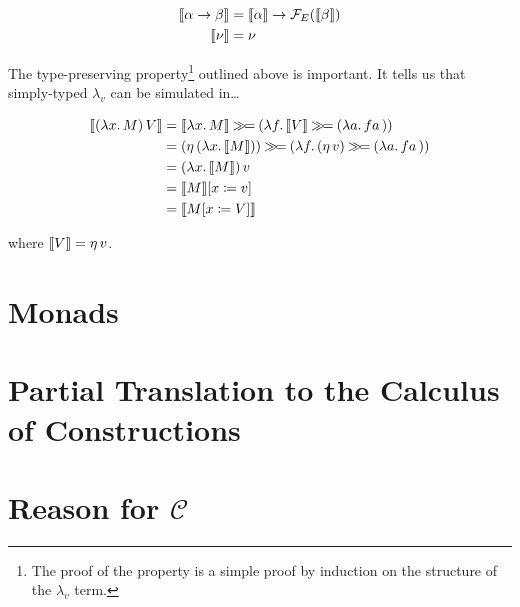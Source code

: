 \begin{align*}
  \llbracket \alpha \to \beta \rrbracket &= \llbracket \alpha \rrbracket \to \mathcal{F}_E(\llbracket \beta \rrbracket) \\
  \llbracket \nu \rrbracket &= \nu
\end{align*}

The type-preserving property\footnote{The proof of the property is a simple
  proof by induction on the structure of the $\lambda_v$ term.} outlined
above is important. It tells us that simply-typed $\lambda_v$ can be
simulated in\ldots

\begin{align*}
  \llbracket (\lambda x.\, M)\,V \rrbracket
&= \llbracket \lambda x.\, M \rrbracket \mathbin{\gg\!=} (\lambda f.\, \llbracket V \rrbracket \mathbin{\gg\!=} (\lambda a.\, f a\,)) \\
&= (\eta\,(\lambda x.\, \llbracket M \rrbracket)) \mathbin{\gg\!=} (\lambda f.\, (\eta\,v) \mathbin{\gg\!=} (\lambda a.\, f a\,)) \\
&= (\lambda x.\, \llbracket M \rrbracket)\,v \\
&= \llbracket M \rrbracket[x \coloneqq v] \\
&= \llbracket M[x \coloneqq V] \rrbracket
\end{align*}

where $\llbracket V \rrbracket = \eta\,v$.

\section{Monads}
\label{sec:monads}


\section{Partial Translation to the Calculus of Constructions}
\label{sec:translation-to-coc}


\section{Reason for $\mathcal{C}$}
\label{sec:reason-for-c}


